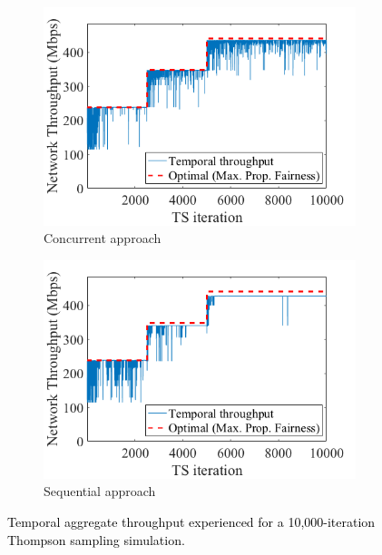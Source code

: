 \documentclass{article}
\begin{document}
	\begin{figure}[h!]
		\centering
		\begin{subfigure}[b]{0.45\textwidth}
			\includegraphics[width=\textwidth]{images/temporal_aggregate_tpt_dynamic_scenario_async_TS}
			\caption{Concurrent approach}
			\label{fig:temporal_aggregate_tpt_dynamic_scenario_async_TS}
		\end{subfigure}
		\begin{subfigure}[b]{0.45\textwidth}
			\includegraphics[width=\textwidth]{images/temporal_aggregate_tpt_dynamic_scenario_ordered_TS}
			\caption{Sequential approach}
			\label{fig:temporal_aggregate_tpt_dynamic_scenario_ordered_TS}
		\end{subfigure}
		\caption{\textcolor{black}{Temporal aggregate throughput experienced for a 10,000-iteration Thompson sampling simulation.}}
		\label{fig:dynamic_enviroment}
	\end{figure}
	
\end{document}
